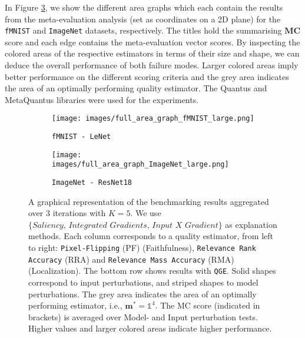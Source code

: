 In Figure \ref{fig:meta_eval_area_graph_fmnist}, we show the different area graphs which each contain the results from the meta-evaluation analysis (set as coordinates on a 2D plane) for the \texttt{fMNIST} \cite{fashionmnist2015} and \texttt{ImageNet} \cite{ILSVRC15} datasets, respectively. The titles hold the summarising $\mathbf{MC}$ score and each edge contains the meta-evaluation vector scores. By inspecting the colored areas of the respective estimators in terms of their size and shape, we can deduce the overall performance of both failure modes. Larger colored areas imply better performance on the different scoring criteria and the grey area indicates the area of an optimally performing quality estimator. The Quantus \cite{hedstrom2022quantus} and MetaQuantus \cite{hedstrom2023metaquantus} libraries were used for the experiments.

\begin{figure}[h!]
    \begin{subfigure}[b]{\columnwidth}
        \centering
        \texttt{[image: images/full\_area\_graph\_fMNIST\_large.png]}
        \caption{\texttt{fMNIST - LeNet}}
        \label{fig:fmnist}
    \end{subfigure}
    
    \vspace{1em} %
    
    \begin{subfigure}[b]{\columnwidth}
        \centering
        \texttt{[image: images/full\_area\_graph\_ImageNet\_large.png]}
        \caption{\texttt{ImageNet - ResNet18}}
        \label{fig:imagenet}
    \end{subfigure}
    \caption{
 A graphical representation of the benchmarking results aggregated over 3 iterations with $K=5$. We use $\{\textit{Saliency, Integrated Gradients, Input X Gradient}\}$ as explanation methods.
 Each column corresponds to a quality estimator, from left to right: \texttt{Pixel-Flipping} (PF) (Faithfulness), \texttt{Relevance Rank Accuracy} (RRA) and \texttt{Relevance Mass Accuracy} (RMA)
 (Localization). The bottom row shows results with \texttt{QGE}. Solid shapes correspond to input perturbations, and striped shapes to model perturbations. The grey area indicates the area of an optimally performing estimator, i.e., $\mathbf{m}^{*} = \mathbb{1}^4$. The MC score (indicated in brackets) is averaged over Model- and Input perturbation tests. Higher values and larger colored areas indicate higher performance.} 
\label{fig:meta_eval_area_graph_fmnist}
\end{figure}

